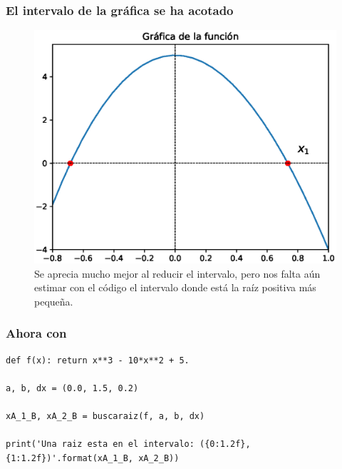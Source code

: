 \begin{frame}
\frametitle{El intervalo de la gráfica se ha acotado}
\begin{figure}
	\centering
	\includegraphics[scale=0.5]{Imagenes/aprox_sucesivas_2020_02.eps}
	\caption{Se aprecia mucho mejor al reducir el intervalo, pero nos falta aún estimar con el código el intervalo donde está la raíz positiva más pequeña.} 
\end{figure}
\end{frame}
\begin{frame}[fragile]
\frametitle{Ahora con \python}
\begin{lstlisting}[caption=Solución con python, style=codigopython]
def f(x): return x**3 - 10*x**2 + 5.

a, b, dx = (0.0, 1.5, 0.2)

xA_1_B, xA_2_B = buscaraiz(f, a, b, dx)

print('Una raiz esta en el intervalo: ({0:1.2f}, {1:1.2f})'.format(xA_1_B, xA_2_B))
\end{lstlisting}
\end{frame}
